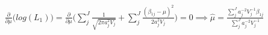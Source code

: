 \begin{multline}
\frac{\partial}{\partial \mu}\Big(log(L_1)\Big) =
\frac{\partial}{\partial \mu} \Big(\sum\limits_j^J \frac{1}{\sqrt{2 \pi a_j^2 V_j}} + \sum\limits_j^J \frac{(\beta_{1j} - \mu)^2}{2 a_j^2V_j}\Big) = 0
\implies \hat{\mu} = \frac{\sum\limits_j^J a_j^{-2}V_j^{-1}\beta_{1j}}{\sum\limits_j^J a_j^{-2}V_j^{-1}}
\end{multline}